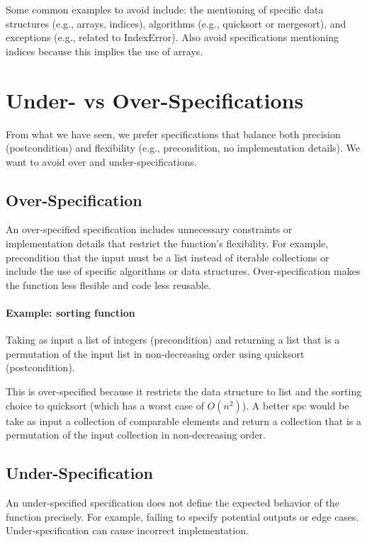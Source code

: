 \documentclass[oneside,11pt,dvipsnames]{book}
\begin{document}
Some common examples to avoid include: the mentioning of specific data structures (e.g., arrays, indices), algorithms (e.g., quicksort or mergesort), and exceptions (e.g., related to IndexError). Also avoid specifications mentioning indices because this implies the use of arrays.

\section{Under- vs Over-Specifications}

From what we have seen, we prefer specifications that balance both precision (postcondition) and flexibility (e.g., precondition, no implementation details). We want to avoid over and under-specifications.

\subsection{Over-Specification} 

An over-specified specification includes unnecessary constraints or implementation details that restrict the function's flexibility. For example, precondition that the input must be a list instead of iterable collections or include the use of specific algorithms or data structures. Over-specification makes the function less flesible and code less reusable.

\paragraph{Example: sorting function} Taking as input a list of integers (precondition) and returning a list that is a permutation of the input list in non-decreasing order using quicksort (postcondition). 

This is over-specified because it restricts the data structure to list and the sorting choice to quicksort (which has a worst case of $O(n^2)$).
A better spc would be take as input a collection of comparable elements and return a collection that is a permutation of the input collection in non-decreasing order. 


\subsection{Under-Specification}

An under-specified specification does not define the expected behavior of the function precisely. For example, failing to specify potential outputs or edge cases. Under-specification can cause incorrect implementation.
\end{document}
